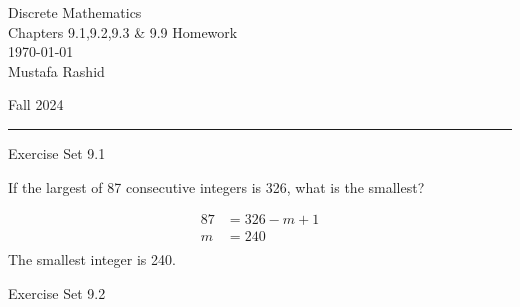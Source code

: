 \documentclass[12pt,letterpaper, onecolumn]{exam}
\begin{document}
	
	\begingroup  
	\noindent\LARGE Discrete Mathematics\\
	\noindent\LARGE Chapters 9.1,9.2,9.3 \& 9.9 Homework\\
	\noindent\large \today\\
	\noindent\large Mustafa Rashid\par
	\noindent\large Fall 2024\par
	\endgroup
	\rule{\textwidth}{0.4pt}
	\pointsdroppedatright
	\printanswers
	\renewcommand{\solutiontitle}{\noindent\textbf{Ans:}\enspace}  
	
	\centerline{Exercise Set 9.1}
	\begin{questions}
	\setcounter{question}{23}\question If the largest of 87 consecutive integers is 326, what is the smallest?
	\begin{solution}
	\begin{align*}
		87&=326-m+1\\
		m&=240\\
	\end{align*}
	The smallest integer is 240.
	\end{solution}
	\end{questions}
	\centerline{Exercise Set 9.2}
\end{document}
